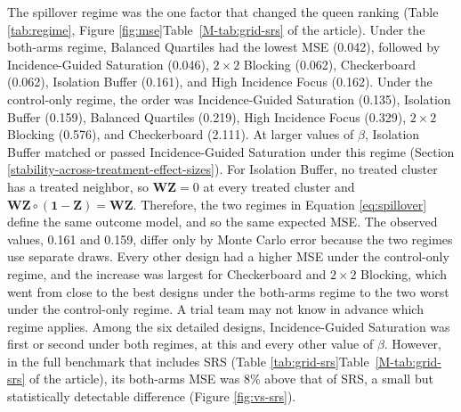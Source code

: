 \documentclass[11pt]{article}
\begin{document}
The spillover regime was the one factor that changed the queen ranking
(\iffullsi Table \ref{tab:regime}, Figure \ref{fig:mse}\else Table~\ref{M-tab:grid-srs} of the article\fi). Under the both-arms
regime, Balanced Quartiles had the lowest MSE (0.042), followed by
Incidence-Guided Saturation (0.046), \(2\times2\) Blocking
(0.062), Checkerboard (0.062), Isolation Buffer (0.161), and High
Incidence Focus (0.162). Under the control-only regime, the order was
Incidence-Guided Saturation (0.135), Isolation Buffer (0.159),
Balanced Quartiles (0.219), High Incidence Focus (0.329), \(2\times2\)
Blocking (0.576), and Checkerboard (2.111). At larger values of
\(\beta\), Isolation Buffer matched or passed Incidence-Guided Saturation under this regime (Section \ref{stability-across-treatment-effect-sizes}). For Isolation Buffer, no treated cluster has a treated neighbor,
so \(\mathbf{W}\mathbf{Z} = 0\) at every treated cluster and \(\mathbf{W}\mathbf{Z} \circ (\mathbf{1} - \mathbf{Z}) = \mathbf{W}\mathbf{Z}\).
Therefore, the two regimes in Equation \ref{eq:spillover} define the same outcome model, and so the same expected MSE. The observed values, 0.161
and 0.159, differ only by Monte Carlo error because the two regimes use
separate draws. Every other design had a higher MSE under the
control-only regime, and the increase was largest for Checkerboard and
\(2\times2\) Blocking, which went from close to the best designs under
the both-arms regime to the two worst under the control-only regime.
A trial team may not know in advance which regime applies. Among the six detailed designs, Incidence-Guided Saturation was first or second under both regimes, at this and every other value of $\beta$. However, in the full benchmark that includes SRS (\iffullsi Table \ref{tab:grid-srs}\else Table~\ref{M-tab:grid-srs} of the article\fi), its both-arms MSE was 8\% above that of SRS, a small but statistically detectable difference (Figure \ref{fig:vs-srs}).
\end{document}
